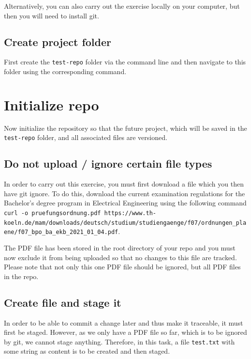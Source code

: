 \documentclass[
  letterpaper,
  DIV=11,
  numbers=noendperiod]{scrreprt}
\begin{document}
Alternatively, you can also carry out the exercise locally on your
computer, but then you will need to install git.

\hypertarget{create-project-folder}{%
\subsection{Create project folder}\label{create-project-folder}}

First create the \texttt{test-repo} folder via the command line and then
navigate to this folder using the corresponding command.

\hypertarget{initialize-repo}{%
\section{Initialize repo}\label{initialize-repo}}

Now initialize the repository so that the future project, which will be
saved in the \texttt{test-repo} folder, and all associated files are
versioned.

\hypertarget{do-not-upload-ignore-certain-file-types}{%
\subsection{Do not upload / ignore certain file
types}\label{do-not-upload-ignore-certain-file-types}}

In order to carry out this exercise, you must first download a file
which you then have git ignore. To do this, download the current
examination regulations for the Bachelor's degree program in Electrical
Engineering using the following command
\texttt{curl\ -o\ pruefungsordnung.pdf\ https://www.th-koeln.de/mam/downloads/deutsch/studium/studiengaenge/f07/ordnungen\_plaene/f07\_bpo\_ba\_ekb\_2021\_01\_04.pdf}.

The PDF file has been stored in the root directory of your repo and you
must now exclude it from being uploaded so that no changes to this file
are tracked. Please note that not only this one PDF file should be
ignored, but all PDF files in the repo.

\hypertarget{create-file-and-stage-it}{%
\subsection{Create file and stage it}\label{create-file-and-stage-it}}

In order to be able to commit a change later and thus make it traceable,
it must first be staged. However, as we only have a PDF file so far,
which is to be ignored by git, we cannot stage anything. Therefore, in
this task, a file \texttt{test.txt} with some string as content is to be
created and then staged.
\end{document}
